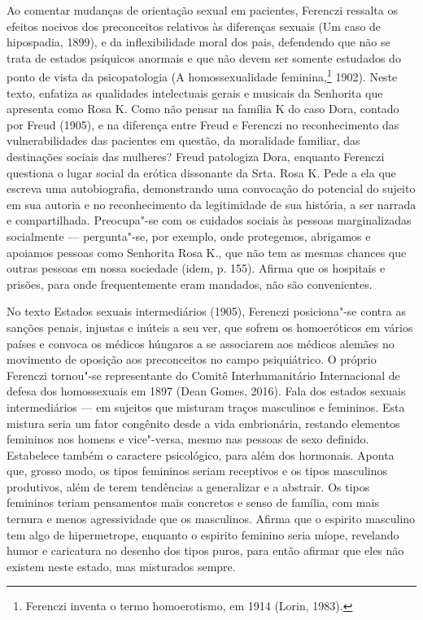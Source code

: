Ao comentar mudanças de orientação sexual em pacientes, Ferenczi
ressalta os efeitos nocivos dos preconceitos relativos às diferenças
sexuais (Um caso de hipospadia, 1899), e da inflexibilidade moral dos
pais, defendendo que não se trata de estados psíquicos anormais e que
não devem ser somente estudados do ponto de vista da psicopatologia (A
homossexualidade feminina,\footnote{Ferenczi inventa o termo
  homoerotismo, em 1914 (Lorin, 1983).} 1902). Neste texto, enfatiza as
qualidades intelectuais gerais e musicais da Senhorita que apresenta
como Rosa K. Como não pensar na família K do caso Dora, contado por
Freud (1905), e na diferença entre Freud e Ferenczi no reconhecimento
das vulnerabilidades das pacientes em questão, da moralidade familiar,
das destinações sociais das mulheres? Freud patologiza Dora, enquanto
Ferenczi questiona o lugar social da erótica dissonante da Srta. Rosa K.
Pede a ela que escreva uma autobiografia, demonstrando uma convocação do
potencial do sujeito em sua autoria e no reconhecimento da legitimidade
de sua história, a ser narrada e compartilhada. Preocupa"-se com os
cuidados sociais às pessoas marginalizadas socialmente --- pergunta"-se,
por exemplo, onde protegemos, abrigamos e apoiamos pessoas como
Senhorita Rosa K., que não tem as mesmas chances que outras pessoas em
nossa sociedade (idem, p. 155). Afirma que os hospitais e prisões, para
onde frequentemente eram mandados, não são convenientes.

No texto Estados sexuais intermediários (1905), Ferenczi posiciona"-se
contra as sanções penais, injustas e inúteis a seu ver, que sofrem os
homoeróticos em vários países e convoca os médicos húngaros a se
associarem aos médicos alemães no movimento de oposição aos preconceitos
no campo psiquiátrico. O próprio Ferenczi tornou"-se representante do
Comitê Interhumanitário Internacional de defesa dos homossexuais em 1897
(Dean Gomes, 2016). Fala dos estados sexuais intermediários --- em
sujeitos que misturam traços masculinos e femininos. Esta mistura seria
um fator congênito desde a vida embrionária, restando elementos
femininos nos homens e vice"-versa, mesmo nas pessoas de sexo definido.
Estabelece também o caractere psicológico, para além dos hormonais.
Aponta que, grosso modo, os tipos femininos seriam receptivos e os tipos
masculinos produtivos, além de terem tendências a generalizar e a
abstrair. Os tipos femininos teriam pensamentos mais concretos e senso
de família, com mais ternura e menos agressividade que os masculinos.
Afirma que o espirito masculino tem algo de hipermetrope, enquanto o
espirito feminino seria míope, revelando humor e caricatura no desenho
dos tipos puros, para então afirmar que eles não existem neste estado,
mas misturados sempre.

